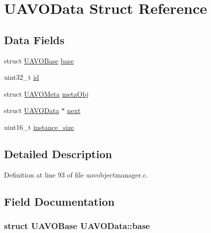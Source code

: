 \hypertarget{struct_u_a_v_o_data}{\section{\-U\-A\-V\-O\-Data \-Struct \-Reference}
\label{struct_u_a_v_o_data}
}
\subsection*{\-Data \-Fields}
\begin{DoxyCompactItemize}
\item 
struct \hyperlink{struct_u_a_v_o_base}{\-U\-A\-V\-O\-Base} \hyperlink{struct_u_a_v_o_data_acf898b0b5f95119ac33559f504c073cf}{base}
\item 
uint32\-\_\-t \hyperlink{struct_u_a_v_o_data_aead38a840ec3156c37871e121c202e40}{id}
\item 
struct \hyperlink{struct_u_a_v_o_meta}{\-U\-A\-V\-O\-Meta} \hyperlink{struct_u_a_v_o_data_a81dba5fc31f263dc85688f290703f9c5}{meta\-Obj}
\item 
struct \hyperlink{struct_u_a_v_o_data}{\-U\-A\-V\-O\-Data} $\ast$ \hyperlink{struct_u_a_v_o_data_a69aa4b26e0e8727f2e9a418f42d056a0}{next}
\item 
uint16\-\_\-t \hyperlink{struct_u_a_v_o_data_a1ba7707e476478c92318fe6589e3dfd9}{instance\-\_\-size}
\end{DoxyCompactItemize}


\subsection{\-Detailed \-Description}


\-Definition at line 93 of file uavobjectmanager.\-c.



\subsection{\-Field \-Documentation}
\hypertarget{struct_u_a_v_o_data_acf898b0b5f95119ac33559f504c073cf}{
\subsubsection[{base}]{\setlength{\rightskip}{0pt plus 5cm}struct {\bf \-U\-A\-V\-O\-Base} {\bf \-U\-A\-V\-O\-Data\-::base}}}\label{struct_u_a_v_o_data_acf898b0b5f95119ac33559f504c073cf}


